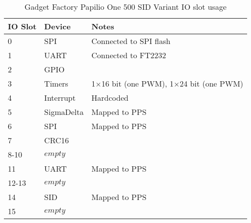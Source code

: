 \documentclass[12pt,a4paper,openany,smallheadings,headinclude,headsepline,final]{scrreprt}
\def \board {Gadget Factory Papilio One 500 SID Variant }
\begin{document}
\begin{table}[H]
\begin{center}
\begin{tabularx}{14cm}{llX}
IO Slot & Device & Notes \\
\hline
0 & SPI         & Connected to SPI flash \\
1 & UART	& Connected to FT2232 \\
2 & GPIO 	& \\
3 & Timers 	& 1$\times$16 bit (one PWM), 1$\times$24 bit (one PWM) \\
4 & Interrupt 	& Hardcoded \\
5 & SigmaDelta 	& Mapped to PPS \\
6 & SPI 	& Mapped to PPS \\
7 & CRC16 	& \\
8-10 & $empty$ 	& \\
11 & UART 	& Mapped to PPS \\
12-13 & $empty$    & \\
14 & SID     & Mapped to PPS \\
15 & $empty$ & 
\end{tabularx}
\caption{\board IO slot usage}
\end{center}
\end{table}
\end{document}
